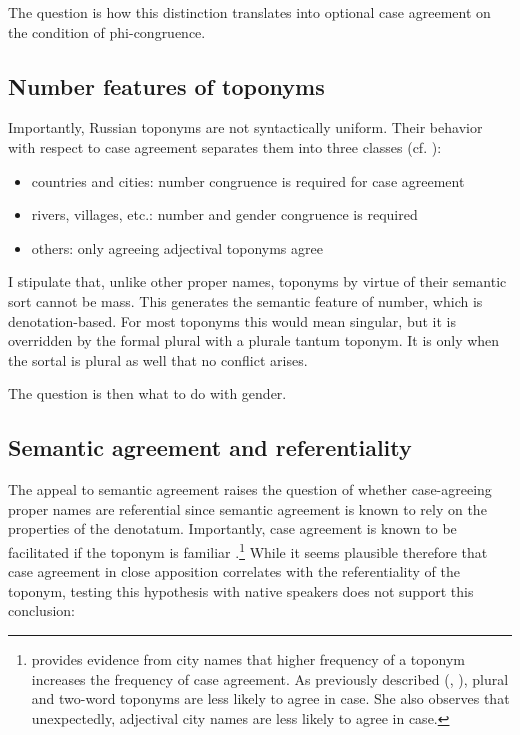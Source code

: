 \documentclass[output=paper,colorlinks,citecolor=brown]{langscibook}
\begin{document}
The question is how this distinction translates into optional case agreement on the condition of phi-congruence.

\subsection{Number features of toponyms}\label{mat:sec:number-features-of-toponyms}\largerpage

Importantly, Russian toponyms are not syntactically uniform. Their behavior with respect to case agreement separates them into three classes (cf. ): 

\begin{itemize}
    \item countries and cities: number congruence is required for case agreement
    \item rivers, villages, etc.: number and gender congruence is required
    \item others: only agreeing adjectival toponyms agree
\end{itemize}

I stipulate that, unlike other proper names, toponyms by virtue of their semantic sort cannot be mass. This generates the semantic feature of number, which is denotation-based. For most toponyms this would mean singular, but it is overridden by the formal plural with a plurale tantum toponym. It is only when the sortal is plural as well that no conflict arises.

The question is then what to do with gender.

\subsection{Semantic agreement and referentiality}\label{mat:sec:semantic-agreement-referentiality}\largerpage[2]

The appeal to semantic agreement raises the question of whether case-agreeing proper names are referential since semantic agreement is known to rely on the properties of the denotatum. Importantly, case agreement is known to be facilitated if the toponym is familiar \citep{GraudinaKatlinskaja1976, RozentalKabanova1998, Logvinova2018, LogvinovaInPress}.\footnote{\citet[][56]{LogvinovaInPress} provides evidence from city names that higher frequency of a toponym increases the frequency of case agreement. As previously described (\citealt{GraudinaKatlinskaja1976}, \citealt{RozentalKabanova1998}), plural and two-word toponyms are less likely to agree in case. She also observes that unexpectedly, adjectival city names are less likely to agree in case.} While it seems plausible therefore that case agreement in close apposition correlates with the referentiality of the toponym, testing this hypothesis with native speakers does not support this conclusion:
\end{document}
